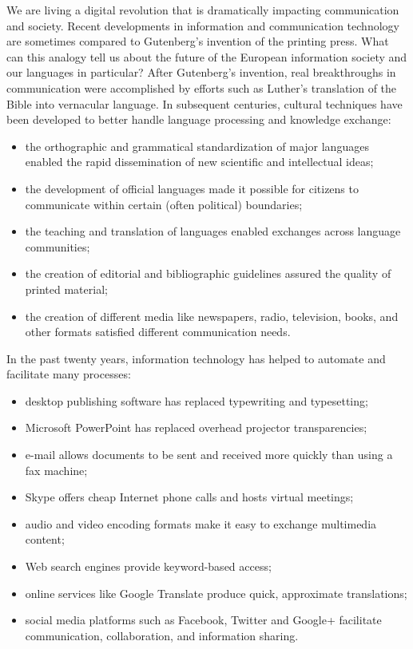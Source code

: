 \begin{multicols}{2}

We are living a digital revolution that is dramatically impacting communication and society. Recent developments in information and communication technology are sometimes compared to Gutenberg's invention of the printing press. What can this analogy tell us about the future of the European information society and our languages in particular?
After Gutenberg's invention, real breakthroughs in communication were accomplished by efforts such as Luther's translation of the Bible into vernacular language. In subsequent centuries, cultural techniques have been developed to better handle language processing and knowledge exchange:

\begin{itemize}
\item the orthographic and grammatical standardization of major languages enabled the rapid dissemination of new scientific and intellectual ideas;
\item the development of official languages made it possible for citizens to communicate within certain (often political) boundaries;
\item the teaching and translation of languages enabled exchanges across language communities;
\item the creation of editorial and bibliographic guidelines assured the quality of printed material;
\item the creation of different media like newspapers, radio, television, books, and other formats satisfied different communication needs. 
\end{itemize}

In the past twenty years, information technology has helped to automate and facilitate many processes:

\begin{itemize}
\item desktop publishing software has replaced typewriting and typesetting;
\item Microsoft PowerPoint has replaced overhead projector transparencies;
\item e-mail allows documents to be sent and received more quickly than using a fax machine;
\item Skype offers cheap Internet phone calls and hosts virtual meetings;
\item audio and video encoding formats make it easy to exchange multimedia content;
\item Web search engines provide keyword-based access;
\item online services like Google Translate produce quick, approximate translations;
\item social media platforms such as Facebook, Twitter and Google+ facilitate communication, collaboration, and information sharing.
\end{itemize}


\end{multicols}
